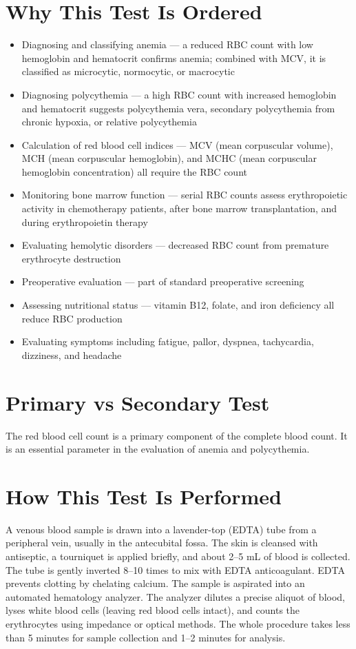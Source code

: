 \section*{Why This Test Is Ordered}
\begin{itemize}
  \item Diagnosing and classifying anemia --- a reduced RBC count with low hemoglobin and hematocrit confirms anemia; combined with MCV, it is classified as microcytic, normocytic, or macrocytic
  \item Diagnosing polycythemia --- a high RBC count with increased hemoglobin and hematocrit suggests polycythemia vera, secondary polycythemia from chronic hypoxia, or relative polycythemia
  \item Calculation of red blood cell indices --- MCV (mean corpuscular volume), MCH (mean corpuscular hemoglobin), and MCHC (mean corpuscular hemoglobin concentration) all require the RBC count
  \item Monitoring bone marrow function --- serial RBC counts assess erythropoietic activity in chemotherapy patients, after bone marrow transplantation, and during erythropoietin therapy
  \item Evaluating hemolytic disorders --- decreased RBC count from premature erythrocyte destruction
  \item Preoperative evaluation --- part of standard preoperative screening
  \item Assessing nutritional status --- vitamin B12, folate, and iron deficiency all reduce RBC production
  \item Evaluating symptoms including fatigue, pallor, dyspnea, tachycardia, dizziness, and headache \cite{simel2009rational}
\end{itemize}

\section*{Primary vs Secondary Test}
The red blood cell count is a primary component of the complete blood count. It is an essential parameter in the evaluation of anemia and polycythemia.

\section*{How This Test Is Performed}
A venous blood sample is drawn into a lavender-top (EDTA) tube from a peripheral vein, usually in the antecubital fossa. The skin is cleansed with antiseptic, a tourniquet is applied briefly, and about 2--5 mL of blood is collected. The tube is gently inverted 8--10 times to mix with EDTA anticoagulant. EDTA prevents clotting by chelating calcium. The sample is aspirated into an automated hematology analyzer. The analyzer dilutes a precise aliquot of blood, lyses white blood cells (leaving red blood cells intact), and counts the erythrocytes using impedance or optical methods. The whole procedure takes less than 5 minutes for sample collection and 1--2 minutes for analysis.

